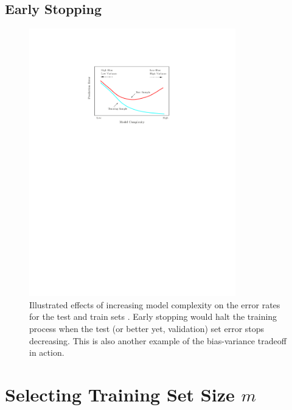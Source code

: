 \subsection{Early Stopping}
\label{ml_general:reg:early_stopping}

\begin{figure}[H]
\centering
\includegraphics[width=0.8\textwidth]{figures/ml/test_train_err_curves}
\caption{
Illustrated effects of increasing model complexity on the error rates for the test and train sets \cite{HastieTF09}.
Early stopping would halt the training process when the test (or better yet, validation) set error stops decreasing.
This is also another example of the bias-variance tradeoff in action.
}
\label{fig:ml_general:early_stopping}
\end{figure}

\section{Selecting Training Set Size \texorpdfstring{$m$}{m}}
\label{ml_general:enough_training_data}

